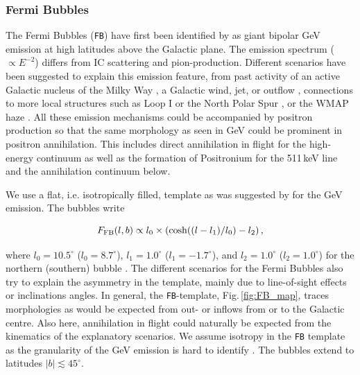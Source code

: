 \documentclass[doublespace,nopageskip]{VTthesis} %
\newcommand{\mrm}[1]{\mathrm{#1}}
\begin{document}
\subsubsection{Fermi Bubbles}

The Fermi Bubbles (\texttt{FB}) have first been identified by \citet{Su2010_fermibubbles} as giant bipolar GeV emission at high latitudes above the Galactic plane.
%
The emission spectrum ($\propto E^{-2}$) differs from IC scattering and pion-production.
%
Different scenarios have been suggested to explain this emission feature, from past activity of an active Galactic nucleus of the Milky Way \citep{Su2010_fermibubbles,Zubovas2012_FermiBubbles_AGN,Guo2012_FermiBubbles_AGN,Yang2017_FermiBubbles_AGN}, a Galactic wind, jet, or outflow \citep{Crocker2012_FermiBubbles_outflows,Sarkar2015_FermiBubbles_outflows,Lacki2014_FermiBubbles_outflows}, connections to more local structures such as Loop I or the North Polar Spur \citep{Kataoka2013_FermiBubbles_local,Sofue2015_NPS_Aquila_FermiBubbles,Ackermann2014_FermiBubbles}, or the WMAP haze \citep{Dobler2012_FermiBubbles_WMAPHaze,Ackermann2014_FermiBubbles,Crocker2015_FermiBubbles_WMAPHaze}.
%
All these emission mechanisms could be accompanied by positron production so that the same morphology as seen in GeV could be prominent in positron annihilation.
%
This includes direct annihilation in flight for the high-energy continuum as well as the formation of Positronium for the 511\,keV line and the annihilation continuum below.

We use a flat, i.e. isotropically filled, template as was suggested by \citet{Macias2018_LATGeV} for the GeV emission.
%
The bubbles write

\begin{equation}
	F_{\rm FB}(l,b) \propto l_0 \times \left( \cosh((l-l_1)/l_0) - l_2 \right)\mrm{,}
	\label{eq:FB_formula}
\end{equation}

\noindent where $l_0 = 10.5^{\circ}$ ($l_0 = 8.7^{\circ}$), $l_1 = 1.0^{\circ}$ ($l_1 = -1.7^{\circ}$), and $l_2 = 1.0^{\circ}$ ($l_2 = 1.0^{\circ}$) for the northern (southern) bubble \citep{Acero2016_FermiLAT_sources}.
%
The different scenarios for the Fermi Bubbles also try to explain the asymmetry in the template, mainly due to line-of-sight effects or inclinations angles.
%
In general, the \texttt{FB}-template, Fig.\,\ref{fig:FB_map}, traces morphologies as would be expected from out- or inflows from or to the Galactic centre.
%
Also here, annihilation in flight could naturally be expected from the kinematics of the explanatory scenarios.
%
We assume isotropy in the \texttt{FB} template as the granularity of the GeV emission is hard to identify \citep{Ackermann2014_FermiBubbles}.
%
The bubbles extend to latitudes $|b| \lesssim 45^{\circ}$.
\end{document}
